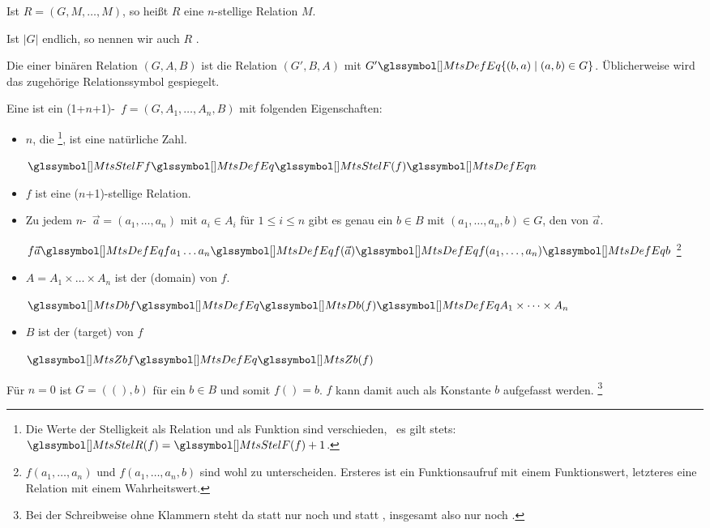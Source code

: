 \begin{description}
	Ist $R=(G,M,\dots,M)$, so heißt $R$ eine $n$-stellige Relation  $M$.

	Ist $|G|$ endlich, so nennen wir auch $R$ .

	\item [\Umkehrrelation] Die  einer binären Relation $(G,A,B)$ ist die Relation $(G',B,A)$ mit $G' \MtsDefEq \{(b,a)\mid(a,b) \in G\}$.
	Üblicherweise wird das zugehörige Relationssymbol gespiegelt.

	\item [\Funktion] Eine  ist ein (1+$n$+1)-\Tupel\ $f = (G,A_1,\dots,A_n,B)$ mit folgenden Eigenschaften:
	\begin{itemize}
		\item $n$, die %
		\footnote{%
			Die Werte der Stelligkeit als Relation und als Funktion sind verschieden, \textdh\ es gilt stets: $\MtsStelR(f) = \MtsStelF(f) + 1$.
		},
		ist eine natürliche Zahl.

		$\MtsStelF f \MtsDefEq \MtsStelF(f) \MtsDefEq n$

		\item $f$ ist eine ($n$+1)-stellige Relation.

		\item Zu jedem $n$-\Tupel\ $\vec{a} = (a_1,\dots,a_n)$ mit $a_i \in A_i$ für $1 \le i \le n$ gibt es genau ein $b \in B$ mit $(a_1,\dots,a_n,b) \in G$, den  von $\vec{a}$.

		$f\vec{a} \MtsDefEq f a_1 \dots a_n \MtsDefEq f(\vec{a}) \MtsDefEq f(a_1,\dots,a_n) \MtsDefEq b$
		\footnote{%
			$f(a_1,\dots,a_n)$ und $f(a_1,\dots,a_n,b)$ sind wohl zu unterscheiden.
			Ersteres ist ein Funktionsaufruf mit einem Funktionswert, letzteres eine Relation mit einem Wahrheitswert.
		}

		\item $A = A_1 \times \dots \times A_n$ ist der  (domain) von $f$.

		$\MtsDb f \MtsDefEq \MtsDb(f) \MtsDefEq A_1 \times \dots \times A_n$

		\item $B$ ist der  (target) von $f$

		$\MtsZb f \MtsDefEq \MtsZb(f)$
	\end{itemize}
	Für $n = 0$ ist $G = ((),b)$ für ein $b \in B$ und somit $f() = b$. $f$ kann damit auch als Konstante $b$ aufgefasst werden.%
	\footnote{%
		Bei der Schreibweise ohne Klammern steht da statt  nur noch  und statt , insgesamt also nur noch .
	}


\end{description}
